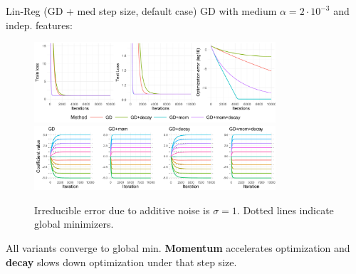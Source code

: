\documentclass[11pt,compress,t,notes=noshow, xcolor=table]{beamer}
\begin{document}
\begin{vbframe}{Lin-Reg (GD + med step size, default case)}
\vspace{-0.4cm}
GD with medium $\alpha=2\cdot10^{-3}$ and indep. features:
\begin{figure}            \includegraphics[width=0.8\textwidth]{figure_man/simu_linmod/GD_reg_med_lr_iters.pdf} \\

             \includegraphics[width=0.8\textwidth]{figure_man/simu_linmod/GD_reg_coef_med.pdf}\\
            \begin{footnotesize}
                Irreducible error due to additive noise is $\sigma=1$. Dotted lines indicate global minimizers.
            \end{footnotesize}
\end{figure}
All variants converge to global min. \textbf{Momentum} accelerates optimization and \textbf{decay} slows down optimization under that step size.
\end{vbframe}
\end{document}
